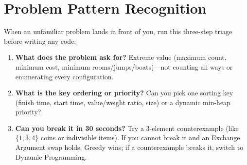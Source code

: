 \documentclass[11pt,a4paper]{article}
\theoremstyle{definition}
\begin{document}
\section{Problem Pattern Recognition}

When an unfamiliar problem lands in front of you, run this three-step triage before writing any code:
\begin{enumerate}
    \item \textbf{What does the problem ask for?} Extreme value (maximum count, minimum cost, minimum rooms/jumps/boats)---not counting all ways or enumerating every configuration.
    \item \textbf{What is the key ordering or priority?} Can you pick one sorting key (finish time, start time, value/weight ratio, size) or a dynamic min-heap priority?
    \item \textbf{Can you break it in 30 seconds?} Try a 3-element counterexample (like $\{1, 3, 4\}$ coins or indivisible items). If you cannot break it and an Exchange Argument swap holds, Greedy wins; if a counterexample breaks it, switch to Dynamic Programming.
\end{enumerate}
\end{document}
